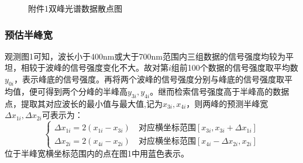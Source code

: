 \documentclass{article}
\numberwithin{equation}{subsection}
\begin{document}
\begin{figure}[htbp]
{    }
    \quad
    \caption{附件1双峰光谱数据散点图}
\end{figure}

\subsubsection{预估半峰宽}
观测图1可知，波长小于400nm或大于700nm范围内三组数据的信号强度均较为平坦，相较于波峰的信号强度变化不大。故对第$i$组前100个数据的信号强度取平均数$y_{0i}$，表示峰底的信号强度。再将两个波峰的信号强度分别与峰底的信号强度取平均值，便可得到两个分峰的半峰高$y_{3i},y_{4i}$。继而检索信号强度高于半峰高的数据点，提取其对应波长的最小值与最大值,记为$x_{3i},x_{4i}$，则两峰的预测半峰宽$\Delta x_{1i},\Delta x_{2i}$可表示为：
\begin{equation}
\begin{cases}
\Delta x_{1i}=2(x_{1i}-x_{3i})\quad\mbox{对应横坐标范围}[x_{3i},x_{3i}+\Delta x_{1i}]\\
\Delta x_{2i}=2(x_{4i}-x_{2i})\quad\mbox{对应横坐标范围}[x_{4i}-\Delta x_{2i},x_{2i}]
\end{cases}
\end{equation}
位于半峰宽横坐标范围内的点在图1中用蓝色表示。
\end{document}
